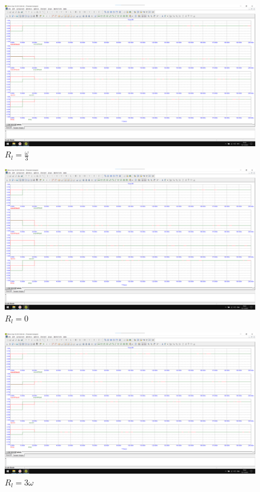 \documentclass[a4paper, 12pt]{article}
\begin{document}
    \begin{figure}[H]
    \centering
    \includegraphics[width = 14 cm]{images/Graph4.png}
    \caption{$R_l = \frac{\omega}{3}$}
    \end{figure}

    \begin{figure}[H]
    \centering
    \includegraphics[width = 14 cm]{images/Graph5.png}
    \caption{$R_l = 0$}
    \end{figure}

    \begin{figure}[H]
    \centering
    \includegraphics[width = 14 cm]{images/Graph6.png}
    \caption{$R_l = 3\omega$}
    \end{figure}
\end{document}
